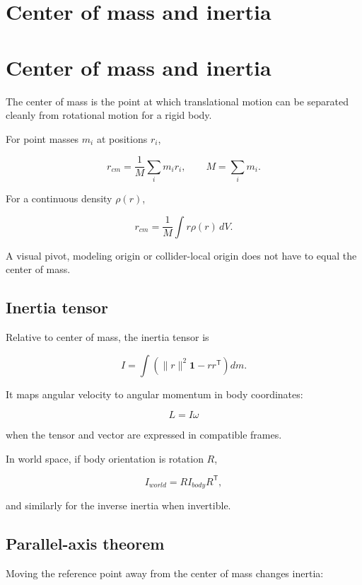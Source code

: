 \hypertarget{appendix-66742099f8a0}{}
\section*{Center of mass and inertia}
\section{Center of mass and inertia}\label{appendix-66742099f8a0-center-of-mass-and-inertia}

The center of mass is the point at which translational motion can be separated cleanly from rotational motion for a rigid body.

For point masses \(m_i\) at positions \(r_i\),

\[
r_{cm}=\frac{1}{M}\sum_i m_i r_i,
\qquad
M=\sum_i m_i.
\]

For a continuous density \(\rho(r)\),

\[
r_{cm}=\frac{1}{M}\int r\rho(r)\,dV.
\]

A visual pivot, modeling origin or collider-local origin does not have to equal the center of mass.

\subsection{Inertia tensor}\label{appendix-66742099f8a0-inertia-tensor}

Relative to center of mass, the inertia tensor is

\[
I=
\int
\left(
\|r\|^2\mathbf{1}-rr^{\mathsf T}
\right)dm.
\]

It maps angular velocity to angular momentum in body coordinates:

\[
L=I\omega
\]

when the tensor and vector are expressed in compatible frames.

In world space, if body orientation is rotation \(R\),

\[
I_{world}=RI_{body}R^{\mathsf T},
\]

and similarly for the inverse inertia when invertible.

\subsection{Parallel-axis theorem}\label{appendix-66742099f8a0-parallel-axis-theorem}

Moving the reference point away from the center of mass changes inertia:

